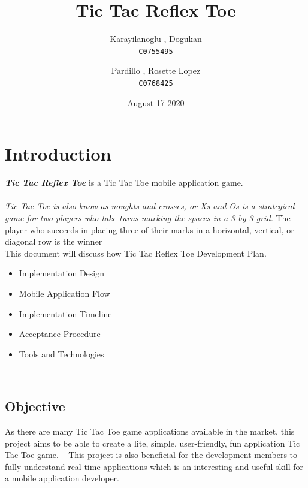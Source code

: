 \documentclass{article}
\title{Tic Tac Reflex Toe}
\author{
  Karayilanoglu , Dogukan \\ \texttt{C0755495}
  \and
  Pardillo , Rosette Lopez \\ \texttt{C0768425}
}
\date{August 17 2020}
\begin{document}
\maketitle
\newpage

\begin{abstract}
\end{abstract}
\newpage

\tableofcontents
\newpage

\listoffigures
\newpage





\section{Introduction}
    \textbf{\emph{Tic Tac Reflex Toe}} is a Tic Tac Toe mobile application game.
    \\\\
    \textit{Tic Tac Toe \emph{is also know as noughts and crosses, or Xs and Os is a strategical game for two players who take turns marking the spaces in a 3 by 3 grid.}}
    The player who succeeds in placing three of their marks in a horizontal, vertical, or diagonal row is the winner
    \\
    This document will discuss how Tic Tac Reflex Toe Development Plan.  
    
    \begin{itemize}
    	\item Implementation Design
    	\item Mobile Application Flow
    	\item Implementation Timeline
    	\item Acceptance Procedure
    	\item Tools and Technologies
    \end{itemize}
    ~\newline
    
    \subsection{Objective}
        As there are many Tic Tac Toe game applications available in the market, this project aims to be able to create a lite, simple, user-friendly, fun application Tic Tac Toe game.
        ~\newline
        This project is also beneficial for the development members to fully understand real time applications which is an interesting and useful skill for a mobile application developer.
   ~\newline
\end{document}
